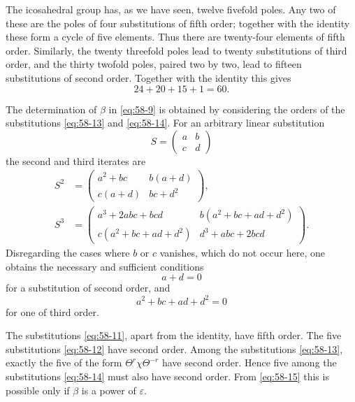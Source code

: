 \documentclass[11pt]{article}
\newcommand{\eps}{\varepsilon}
\begin{document}
The icosahedral group has, as we have seen, twelve fivefold poles.  Any two of these are the poles of four substitutions of fifth order; together with the identity these form a cycle of five elements.  Thus there are twenty-four elements of fifth order.  Similarly, the twenty threefold poles lead to twenty substitutions of third order, and the thirty twofold poles, paired two by two, lead to fifteen substitutions of second order.  Together with the identity this gives
\[
 24+20+15+1=60.
\]

The determination of \(\beta\) in \eqref{eq:58-9} is obtained by considering the orders of the substitutions \eqref{eq:58-13} and \eqref{eq:58-14}.  For an arbitrary linear substitution
\[
 S=\begin{pmatrix}a&b\\c&d\end{pmatrix}
\]
the second and third iterates are
\begin{align*}
 S^2&=\begin{pmatrix}a^2+bc&b(a+d)\\c(a+d)&bc+d^2\end{pmatrix},\\
 S^3&=\begin{pmatrix}a^3+2abc+bcd&b(a^2+bc+ad+d^2)\\ c(a^2+bc+ad+d^2)&d^3+abc+2bcd\end{pmatrix}.
\end{align*}
Disregarding the cases where \(b\) or \(c\) vanishes, which do not occur here, one obtains the necessary and sufficient conditions
\begin{equation}\label{eq:58-15}
 a+d=0
\end{equation}
for a substitution of second order, and
\begin{equation}\label{eq:58-16}
 a^2+bc+ad+d^2=0
\end{equation}
for one of third order.

The substitutions \eqref{eq:58-11}, apart from the identity, have fifth order.  The five substitutions \eqref{eq:58-12} have second order.  Among the substitutions \eqref{eq:58-13}, exactly the five of the form \(\Theta^r\chi\Theta^{-r}\) have second order.  Hence five among the substitutions \eqref{eq:58-14} must also have second order.  From \eqref{eq:58-15} this is possible only if \(\beta\) is a power of \(\eps\).
\end{document}
